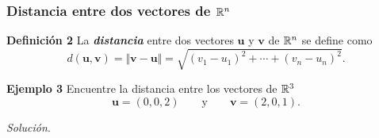 \begin{frame}\frametitle{Distancia entre dos vectores de $\mathbb{R}^n$}
	
	\begin{defi}{\textbf{Definición 2}}\justifying
		La \textbf{\textit{distancia}} entre dos vectores $\mathbf{u}$ y $\mathbf{v}$ de $\mathbb{R}^n$ se define como
		\[
		d(\mathbf{u},\mathbf{v}) = \Vert \mathbf{v} - \mathbf{u}\Vert = \sqrt{\left(v_1-u_1 \right)^2+\cdots+\left(v_n-u_n \right)^2}.
		\]
	\end{defi}	
	
	\begin{ej}{\textbf{Ejemplo 3}}
		Encuentre la distancia entre los vectores de  $\mathbb{R}^3$
		\[
		\mathbf{u}=(0,0,2) \qquad \text{y} \qquad \mathbf{v}=(2,0,1).
		\]
	\end{ej}
	\textit{Solución}.
	
\end{frame}


\subsection{}

